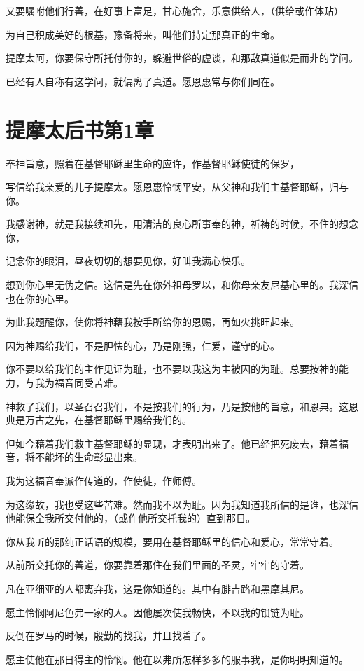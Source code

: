 \documentclass[12pt,oneside]{book}
\begin{document}
又要嘱咐他们行善，在好事上富足，甘心施舍，乐意供给人，（供给或作体贴）

为自己积成美好的根基，豫备将来，叫他们持定那真正的生命。

提摩太阿，你要保守所托付你的，躲避世俗的虚谈，和那敌真道似是而非的学问。

已经有人自称有这学问，就偏离了真道。愿恩惠常与你们同在。

\chapter{提摩太后书第1章}
奉神旨意，照着在基督耶稣里生命的应许，作基督耶稣使徒的保罗，

写信给我亲爱的儿子提摩太。愿恩惠怜悯平安，从父神和我们主基督耶稣，归与你。

我感谢神，就是我接续祖先，用清洁的良心所事奉的神，祈祷的时候，不住的想念你，

记念你的眼泪，昼夜切切的想要见你，好叫我满心快乐。

想到你心里无伪之信。这信是先在你外祖母罗以，和你母亲友尼基心里的。我深信也在你的心里。

为此我题醒你，使你将神藉我按手所给你的恩赐，再如火挑旺起来。

因为神赐给我们，不是胆怯的心，乃是刚强，仁爱，谨守的心。

你不要以给我们的主作见证为耻，也不要以我这为主被囚的为耻。总要按神的能力，与我为福音同受苦难。

神救了我们，以圣召召我们，不是按我们的行为，乃是按他的旨意，和恩典。这恩典是万古之先，在基督耶稣里赐给我们的。

但如今藉着我们救主基督耶稣的显现，才表明出来了。他已经把死废去，藉着福音，将不能坏的生命彰显出来。

我为这福音奉派作传道的，作使徒，作师傅。

为这缘故，我也受这些苦难。然而我不以为耻。因为我知道我所信的是谁，也深信他能保全我所交付他的，（或作他所交托我的）直到那日。

你从我听的那纯正话语的规模，要用在基督耶稣里的信心和爱心，常常守着。

从前所交托你的善道，你要靠着那住在我们里面的圣灵，牢牢的守着。

凡在亚细亚的人都离弃我，这是你知道的。其中有腓吉路和黑摩其尼。

愿主怜悯阿尼色弗一家的人。因他屡次使我畅快，不以我的锁链为耻。

反倒在罗马的时候，殷勤的找我，并且找着了。

愿主使他在那日得主的怜悯。他在以弗所怎样多多的服事我，是你明明知道的。
\end{document}
